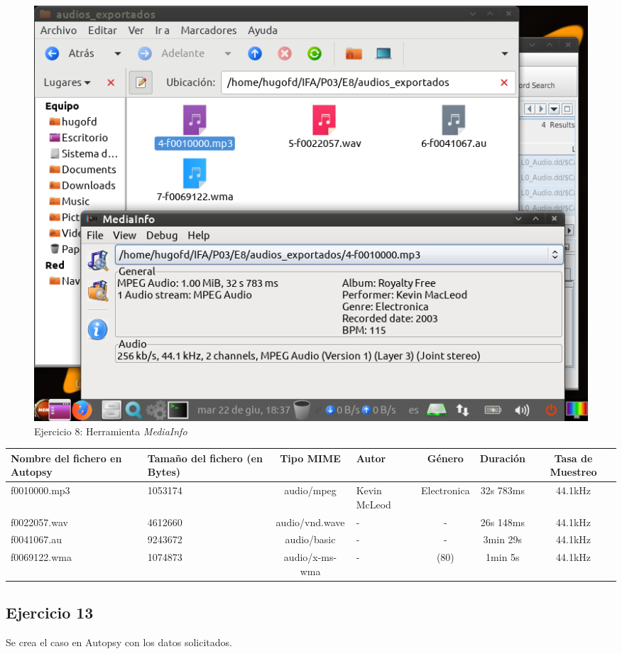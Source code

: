 \documentclass[11pt]{article}
\begin{document}
\begin{figure}[H]
    \caption{Ejercicio 8: Herramienta \textit{MediaInfo}}
    \centering
    \includegraphics[scale=0.7]{p03/e8-6.png}
\end{figure}

\begin{table}[H]
    \centering
    \begin{tabular}{|p{2.5cm}|p{2cm}|c|p{1.5cm}|c|c|c|}
        \hline
        Nombre del fichero en Autopsy & Tamaño del fichero (en Bytes) & Tipo MIME & Autor & Género & Duración & Tasa de Muestreo \\
        \hline\hline
        f0010000.mp3 & 1053174 & audio/mpeg & Kevin McLeod & Electronica & 32s 783ms & 44.1kHz \\
        \hline
        f0022057.wav & 4612660 & audio/vnd.wave & - & - & 26s 148ms & 44.1kHz \\
        \hline
        f0041067.au & 9243672 & audio/basic & - & - & 3min 29s & 44.1kHz \\
        \hline
        f0069122.wma & 1074873 & audio/x-ms-wma & - & (80) & 1min 5s & 44.1kHz \\
        \hline
    \end{tabular}
\end{table}

\subsection{Ejercicio 13}
Se crea el caso en Autopsy con los datos solicitados.
\end{document}
